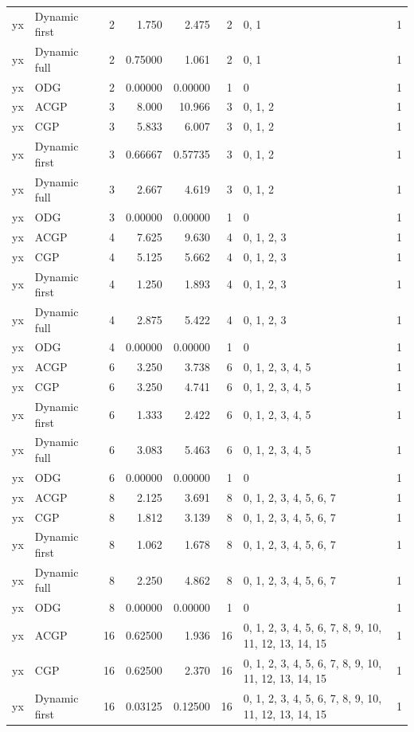 \documentclass[10pt,a4paper]{article}
\begin{document}
\begin{longtable}{@{}p{23mm}p{29mm}rrrrp{36mm}r@{}}
yx & Dynamic first & 2 & 1.750 & 2.475 & 2 & 0, 1 & 1 \\
yx & Dynamic full & 2 & 0.75000 & 1.061 & 2 & 0, 1 & 1 \\
yx & ODG & 2 & 0.00000 & 0.00000 & 1 & 0 & 1 \\
yx & ACGP & 3 & 8.000 & 10.966 & 3 & 0, 1, 2 & 1 \\
yx & CGP & 3 & 5.833 & 6.007 & 3 & 0, 1, 2 & 1 \\
yx & Dynamic first & 3 & 0.66667 & 0.57735 & 3 & 0, 1, 2 & 1 \\
yx & Dynamic full & 3 & 2.667 & 4.619 & 3 & 0, 1, 2 & 1 \\
yx & ODG & 3 & 0.00000 & 0.00000 & 1 & 0 & 1 \\
yx & ACGP & 4 & 7.625 & 9.630 & 4 & 0, 1, 2, 3 & 1 \\
yx & CGP & 4 & 5.125 & 5.662 & 4 & 0, 1, 2, 3 & 1 \\
yx & Dynamic first & 4 & 1.250 & 1.893 & 4 & 0, 1, 2, 3 & 1 \\
yx & Dynamic full & 4 & 2.875 & 5.422 & 4 & 0, 1, 2, 3 & 1 \\
yx & ODG & 4 & 0.00000 & 0.00000 & 1 & 0 & 1 \\
yx & ACGP & 6 & 3.250 & 3.738 & 6 & 0, 1, 2, 3, 4, 5 & 1 \\
yx & CGP & 6 & 3.250 & 4.741 & 6 & 0, 1, 2, 3, 4, 5 & 1 \\
yx & Dynamic first & 6 & 1.333 & 2.422 & 6 & 0, 1, 2, 3, 4, 5 & 1 \\
yx & Dynamic full & 6 & 3.083 & 5.463 & 6 & 0, 1, 2, 3, 4, 5 & 1 \\
yx & ODG & 6 & 0.00000 & 0.00000 & 1 & 0 & 1 \\
yx & ACGP & 8 & 2.125 & 3.691 & 8 & 0, 1, 2, 3, 4, 5, 6, 7 & 1 \\
yx & CGP & 8 & 1.812 & 3.139 & 8 & 0, 1, 2, 3, 4, 5, 6, 7 & 1 \\
yx & Dynamic first & 8 & 1.062 & 1.678 & 8 & 0, 1, 2, 3, 4, 5, 6, 7 & 1 \\
yx & Dynamic full & 8 & 2.250 & 4.862 & 8 & 0, 1, 2, 3, 4, 5, 6, 7 & 1 \\
yx & ODG & 8 & 0.00000 & 0.00000 & 1 & 0 & 1 \\
yx & ACGP & 16 & 0.62500 & 1.936 & 16 & 0, 1, 2, 3, 4, 5, 6, 7, 8, 9, 10, 11, 12, 13, 14, 15 & 1 \\
yx & CGP & 16 & 0.62500 & 2.370 & 16 & 0, 1, 2, 3, 4, 5, 6, 7, 8, 9, 10, 11, 12, 13, 14, 15 & 1 \\
yx & Dynamic first & 16 & 0.03125 & 0.12500 & 16 & 0, 1, 2, 3, 4, 5, 6, 7, 8, 9, 10, 11, 12, 13, 14, 15 & 1 \\

\end{longtable}
\end{document}
